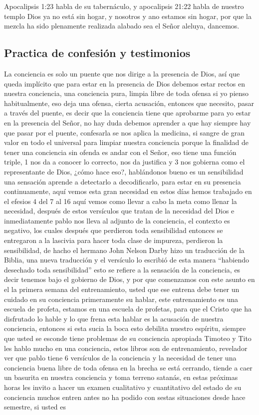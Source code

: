 \documentclass[12pt]{article}
\begin{document}
Apocalipsis 1:23 habla de su tabernáculo, y apocalipsis 21:22 habla de nuestro templo Dios ya no está sin hogar, y nosotros y ano estamos sin hogar, por que la mezcla ha sido plenamente realizada alabado sea el Señor aleluya, dancemos.\\

\subsection*{Practica de confesión y testimonios}

La conciencia es solo un puente que nos dirige a la presencia de Dios,  así que queda implícito que para estar en la presencia de Dios debemos estar rectos en nuestra conciencia, una conciencia pura, limpia libre de toda ofensa si yo pienso habitualmente, eso deja una ofensa, cierta acusación, entonces que necesito, pasar a través del puente, es decir que la conciencia tiene que aprobarme para yo estar en la presencia del Señor, no hay duda debemos aprender a que hay siempre hay que pasar por el puente, confesarla se nos aplica la medicina, si sangre de gran valor en todo el  universal para limpiar nuestra conciencia porque la finalidad de tener una conciencia sin ofenda es andar con el Señor, eso tiene una función triple, 1 nos da a  conocer lo correcto, nos da justifica y 3 nos gobierna como el representante de Dios, ¿cómo hace eso?, hablándonos  bueno es un sensibilidad una sensación aprende a detectarlo a decodificarlo, para estar en su presencia continuamente, aquí vemos esta gran necesidad en estos días hemos trabajado en el efesios 4 del 7 al 16 aquí vemos como llevar a cabo la meta como llenar la necesidad, después de estos versículos que tratan de la necesidad del Dios e inmediatamente pablo nos lleva al adjunto de la conciencia, el contexto es negativo, los cuales después que perdieron toda sensibilidad entonces se entregaron a la lascivia para hacer toda clase de impureza, perdieron la sensibilidad, de hacho el hermano John Nelson Darby hizo un traducción de la Biblia, una nueva traducción y el versículo lo escribió de esta manera “habiendo desechado toda sensibilidad” esto se refiere a la sensación de la conciencia, es decir tenemos bajo el gobierno de Dios, y por que comenzamos con este asunto en el la primera semana del entrenamiento, usted que ese entrena debe tener un cuidado en su conciencia primeramente su hablar, este entrenamiento es una escuela de profeta, estamos en una escuela de profetas, para que el Cristo que ha disfrutado lo hable y lo que frena esta hablar es la acusación de nuestra conciencia, entonces si esta sucia la boca esto debilita nuestro espíritu, siempre que usted se esconde tiene problemas de su conciencia apropiada Timoteo y Tito les hablo mucho en una conciencia, estos libros son de entrenamiento, revelador ver que pablo tiene 6 versículos de la conciencia y la necesidad de tener una conciencia buena libre de toda ofensa en la brecha se está cerrando, tiende a caer un basurita en nuestra conciencia y toma terreno satanás, en estas próximas horas les invito a hacer un examen cualitativo y cuantitativo del estado de su conciencia muchos entren antes no ha podido con sestas situaciones desde hace semestre, si usted es 
\end{document}
